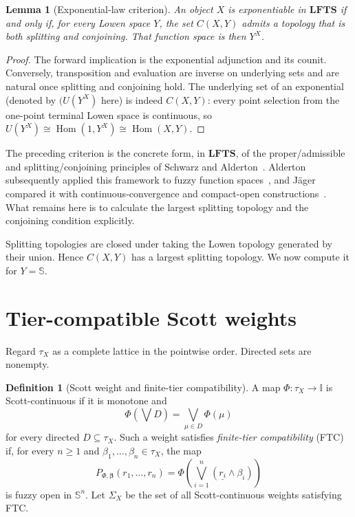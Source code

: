 \documentclass[11pt,a4paper]{article}
\numberwithin{equation}{section}
\newtheorem{lemma}[theorem]{Lemma}
\theoremstyle{definition}
\newtheorem{definition}[theorem]{Definition}
\theoremstyle{remark}
\newcommand{\I}{\mathbb I}
\newcommand{\Sier}{\mathbb S}
\newcommand{\LFTS}{\mathbf{LFTS}}
\newcommand{\const}[1]{\underline{#1}}
\newcommand{\Hom}{\operatorname{Hom}}
\begin{document}
\begin{lemma}[Exponential-law criterion]\label{lem:exp-law-en}
An object \(X\) is exponentiable in \(\LFTS\) if and only if, for every
Lowen space \(Y\), the set \(C(X,Y)\) admits a topology that is both
splitting and conjoining.  That function space is then \(Y^X\).
\end{lemma}

\begin{proof}
The forward implication is the exponential adjunction and its counit.
Conversely, transposition and evaluation are inverse on underlying sets
and are natural once splitting and conjoining hold.  The underlying set
of an exponential (denoted by $(U(Y^X)$ here) is indeed \(C(X,Y)\): every point selection from the
one-point terminal Lowen space is continuous, so
\(U(Y^X)\cong\Hom(1,Y^X)\cong\Hom(X,Y)\).
\end{proof}

The preceding criterion is the concrete form, in \(\LFTS\), of the
proper/admissible and splitting/conjoining principles of Schwarz and
Alderton~\cite{Schwarz1983-en,Alderton1988-en}.  Alderton subsequently
applied this framework to fuzzy function spaces~\cite{Alderton1989-en},
and J\"ager compared it with continuous-convergence and compact-open
constructions~\cite{Jager1999-en}.  What remains here is to calculate
the largest splitting topology and the conjoining condition explicitly.

Splitting topologies are closed under taking the Lowen topology generated
by their union.  Hence \(C(X,Y)\) has a largest splitting topology.  We
now compute it for \(Y=\Sier\).

\section{Tier-compatible Scott weights}

Regard \(\tau_X\) as a complete lattice in the pointwise order.  Directed
sets are nonempty.

\begin{definition}[Scott weight and finite-tier compatibility]
A map \(\Phi:\tau_X\to\I\) is Scott-continuous if it is monotone and
\[
 \Phi(\bigvee D)=\bigvee_{\mu\in D}\Phi(\mu)
\]
for every directed \(D\subseteq\tau_X\).  Such a weight satisfies
\emph{finite-tier compatibility} (FTC) if, for every \(n\geq1\) and
\(\beta_1,\ldots,\beta_n\in\tau_X\), the map
\begin{equation}\label{eq:ftc-en}
 P_{\Phi,\boldsymbol\beta}(r_1,\ldots,r_n)
 =\Phi\left(\bigvee_{i=1}^n
      (\const{r_i}\wedge\beta_i)\right)
\end{equation}
is fuzzy open in \(\Sier^n\).  Let \(\Sigma_X\) be the set of all
Scott-continuous weights satisfying FTC.
\end{definition}
\end{document}
